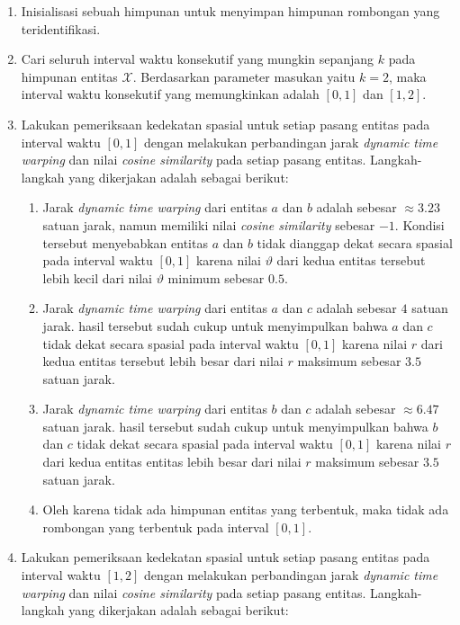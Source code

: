 \begin{enumerate}
    \item Inisialisasi sebuah himpunan untuk menyimpan himpunan rombongan yang teridentifikasi.
    \item Cari seluruh interval waktu konsekutif yang mungkin sepanjang $k$ pada himpunan entitas $\mathcal{X}$. Berdasarkan parameter masukan yaitu $k = 2$, maka interval waktu konsekutif yang memungkinkan adalah $[0, 1]$ dan $[1, 2]$.
    \item Lakukan pemeriksaan kedekatan spasial untuk setiap pasang entitas pada interval waktu $[0, 1]$ dengan melakukan perbandingan jarak \textit{dynamic time warping} dan nilai \textit{cosine similarity} pada setiap pasang entitas. Langkah-langkah yang dikerjakan adalah sebagai berikut: 
    
    \begin{enumerate}
        \item Jarak \textit{dynamic time warping} dari entitas $a$ dan $b$ adalah sebesar $\approx 3.23$ satuan jarak, namun memiliki nilai \textit{cosine similarity} sebesar $-1$. Kondisi tersebut menyebabkan entitas $a$ dan $b$ tidak dianggap dekat secara spasial pada interval waktu $[0, 1]$ karena nilai $\vartheta$ dari kedua entitas tersebut lebih kecil dari nilai $\vartheta$ minimum sebesar $0.5$.
        \item Jarak \textit{dynamic time warping} dari entitas $a$ dan $c$ adalah sebesar $4$ satuan jarak. hasil tersebut sudah cukup untuk menyimpulkan bahwa $a$ dan $c$ tidak dekat secara spasial pada interval waktu $[0, 1]$ karena nilai $r$ dari kedua entitas tersebut lebih besar dari nilai $r$ maksimum sebesar $3.5$ satuan jarak.
        \item Jarak \textit{dynamic time warping} dari entitas $b$ dan $c$ adalah sebesar $\approx 6.47$ satuan jarak. hasil tersebut sudah cukup untuk menyimpulkan bahwa $b$ dan $c$ tidak dekat secara spasial pada interval waktu $[0, 1]$ karena nilai $r$ dari kedua entitas entitas lebih besar dari nilai $r$ maksimum sebesar $3.5$ satuan jarak.
        \item Oleh karena tidak ada himpunan entitas yang terbentuk, maka tidak ada rombongan yang terbentuk pada interval $[0, 1]$.
    \end{enumerate}
    
    \item Lakukan pemeriksaan kedekatan spasial untuk setiap pasang entitas pada interval waktu $[1, 2]$ dengan melakukan perbandingan jarak \textit{dynamic time warping} dan nilai \textit{cosine similarity} pada setiap pasang entitas. Langkah-langkah yang dikerjakan adalah sebagai berikut: 
    

\end{enumerate}
